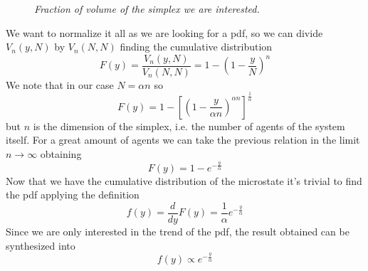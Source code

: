 \begin{figure}[ht!]
    \centering
    \caption{\emph{Fraction of volume of the simplex we are interested.}}
    \label{fig:simplexVolume}
\end{figure}
We want to normalize it all as we are looking for a pdf, so we can divide $V_n\left(y, N\right)$ by $V_n\left(N, N\right)$ finding the cumulative distribution
\begin{equation}
    F(y) = \frac{V_n\left(y, N\right)}{V_n\left(N, N\right)} = 1 - \left(1 - \frac{y}{N}\right)^n
\end{equation}
We note that in our case $N=\alpha n$ so
\begin{equation*}
    F(y) =  1 - \left[\left(1 - \frac{y}{\alpha n}\right)^{\alpha n}\right]^\frac{1}{\alpha}
\end{equation*}
but $n$ is the dimension of the simplex, i.e. the number of agents of the system itself.
For a great amount of agents we can take the previous relation in the limit $n\to\infty$ obtaining
\begin{equation}
    F(y) = 1 - e^{-\frac{y}{\alpha}}
\end{equation}
Now that we have the cumulative distribution of the microstate it's trivial to find the pdf applying the definition
\begin{equation*}
    f(y) = \frac{d}{dy}F(y) = \frac{1}{\alpha} e^{-\frac{y}{\alpha}}
\end{equation*}
Since we are only interested in the trend of the pdf, the result obtained can be synthesized into
\begin{equation}
    f(y) \propto e^{-\frac{y}{\alpha}}
\end{equation}
